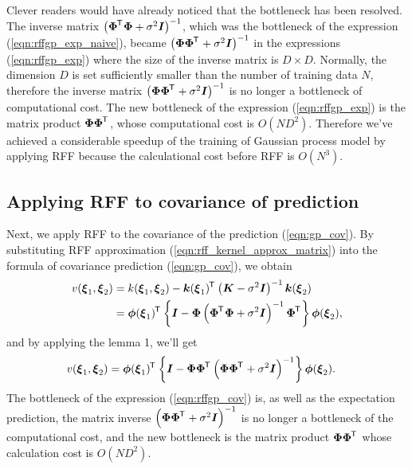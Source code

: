 \documentclass[twocolumn,a4paper,10pt]{article}
\begin{document}
Clever readers would have already noticed that the bottleneck has been resolved.
The inverse matrix $\bigl( \boldsymbol{\Phi}^{\mkern-1.5mu\mathsf{T}}\hspace{0.5pt} \boldsymbol{\Phi} + \sigma^2 \boldsymbol{I} \bigr)^{-1}$,
which was the bottleneck of the expression (\ref{eqn:rffgp_exp_naive}),
became $\bigl( \boldsymbol{\Phi} \boldsymbol{\Phi}^{\mkern-1.5mu\mathsf{T}}\hspace{0.5pt} + \sigma^2 \boldsymbol{I} \bigr)^{-1}$ in the expressions (\ref{eqn:rffgp_exp})
where the size of the inverse matrix is $D \times D$.
Normally, the dimension $D$ is set sufficiently smaller than the number of training data $N$,
therefore the inverse matrix $\bigl( \boldsymbol{\Phi} \boldsymbol{\Phi}^{\mkern-1.5mu\mathsf{T}}\hspace{0.5pt} + \sigma^2 \boldsymbol{I} \bigr)^{-1}$
is no longer a bottleneck of computational cost.
The new bottleneck of the expression (\ref{eqn:rffgp_exp}) is the matrix product $\boldsymbol{\Phi \Phi}^{\mkern-1.5mu\mathsf{T}}\hspace{0.5pt}$,
whose computational cost is $O(ND^2)$.
Therefore we've achieved a considerable speedup of the training of Gaussian process model
by applying RFF because the calculational cost before RFF is $O(N^3)$.

\subsection{Applying RFF to covariance of prediction}

Next, we apply RFF to the covariance of the prediction (\ref{eqn:gp_cov}).
By substituting RFF approximation (\ref{eqn:rff_kernel_approx_matrix}) into the formula of
covariance prediction (\ref{eqn:gp_cov}), we obtain
\begin{align}
    v (\boldsymbol{\xi}_1, \boldsymbol{\xi}_2)
    &= k (\boldsymbol{\xi}_1, \boldsymbol{\xi}_2) - \boldsymbol{k} (\boldsymbol{\xi}_1)^{\mkern-1.5mu\mathsf{T}}\hspace{0.5pt}
    \left( \boldsymbol{K} - \sigma^2 \boldsymbol{I} \right)^{-1} \boldsymbol{k} (\boldsymbol{\xi}_2) \notag \\
    &= \boldsymbol{\phi}(\boldsymbol{\xi}_1)^{\mkern-1.5mu\mathsf{T}}\hspace{0.5pt} \left\{ \boldsymbol{I} - \boldsymbol{\Phi}
    \left( \boldsymbol{\Phi}^{\mkern-1.5mu\mathsf{T}}\hspace{0.5pt} \boldsymbol{\Phi} + \sigma^2 \boldsymbol{I} \right)^{-1}
    \boldsymbol{\Phi}^{\mkern-1.5mu\mathsf{T}}\hspace{0.5pt} \right\} \boldsymbol{\phi}(\boldsymbol{\xi}_2),
\end{align}
and by applying the lemma 1, we'll get
\begin{align}
    v (\boldsymbol{\xi}_1, \boldsymbol{\xi}_2)
    &= \boldsymbol{\phi}(\boldsymbol{\xi}_1)^{\mkern-1.5mu\mathsf{T}}\hspace{0.5pt} \left\{ \boldsymbol{I} - \boldsymbol{\Phi} \boldsymbol{\Phi}^{\mkern-1.5mu\mathsf{T}}\hspace{0.5pt}
    \left( \boldsymbol{\Phi} \boldsymbol{\Phi}^{\mkern-1.5mu\mathsf{T}}\hspace{0.5pt} + \sigma^2 \boldsymbol{I} \right)^{-1} \right\} \boldsymbol{\phi}(\boldsymbol{\xi}_2).
    \label{eqn:rffgp_cov}
\end{align}
The bottleneck of the expression (\ref{eqn:rffgp_cov}) is, as well as the expectation prediction,
the matrix inverse $\left( \boldsymbol{\Phi} \boldsymbol{\Phi}^{\mkern-1.5mu\mathsf{T}}\hspace{0.5pt} + \sigma^2 \boldsymbol{I} \right)^{-1}$ is
no longer a bottleneck of the computational cost, and the new bottleneck is the matrix product
$\boldsymbol{\Phi \Phi}^{\mkern-1.5mu\mathsf{T}}\hspace{0.5pt}$ whose calculation cost is $O(ND^2)$.
\end{document}
